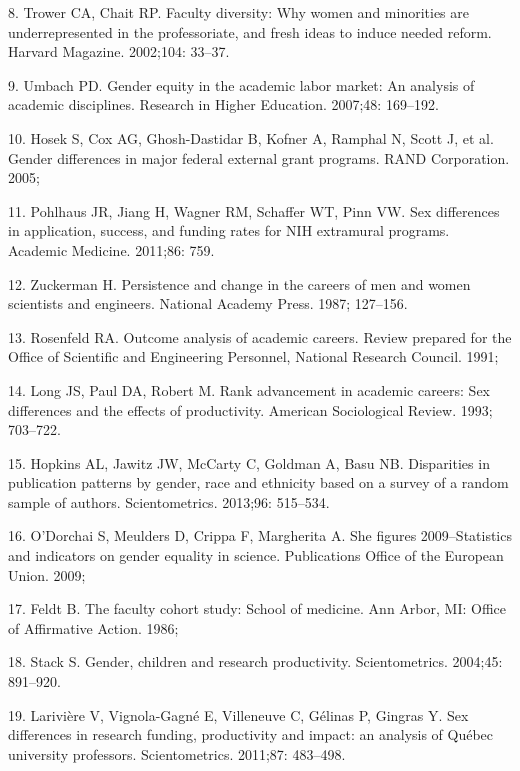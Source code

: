 \documentclass[12pt,]{article}
\begin{document}
\hypertarget{ref-Trower_2002}{}
8. Trower CA, Chait RP. Faculty diversity: Why women and minorities are
underrepresented in the professoriate, and fresh ideas to induce needed
reform. Harvard Magazine. 2002;104: 33--37.

\hypertarget{ref-Umbach_2007}{}
9. Umbach PD. Gender equity in the academic labor market: An analysis of
academic disciplines. Research in Higher Education. 2007;48: 169--192.

\hypertarget{ref-Hosek_2005}{}
10. Hosek S, Cox AG, Ghosh-Dastidar B, Kofner A, Ramphal N, Scott J, et
al. Gender differences in major federal external grant programs. RAND
Corporation. 2005;

\hypertarget{ref-pohlhaus_2011}{}
11. Pohlhaus JR, Jiang H, Wagner RM, Schaffer WT, Pinn VW. Sex
differences in application, success, and funding rates for NIH
extramural programs. Academic Medicine. 2011;86: 759.

\hypertarget{ref-Zuckerman_1987}{}
12. Zuckerman H. Persistence and change in the careers of men and women
scientists and engineers. National Academy Press. 1987; 127--156.

\hypertarget{ref-Rosenfeld_1991}{}
13. Rosenfeld RA. Outcome analysis of academic careers. Review prepared
for the Office of Scientific and Engineering Personnel, National
Research Council. 1991;

\hypertarget{ref-Long_1993}{}
14. Long JS, Paul DA, Robert M. Rank advancement in academic careers:
Sex differences and the effects of productivity. American Sociological
Review. 1993; 703--722.

\hypertarget{ref-Hopkins_2013}{}
15. Hopkins AL, Jawitz JW, McCarty C, Goldman A, Basu NB. Disparities in
publication patterns by gender, race and ethnicity based on a survey of
a random sample of authors. Scientometrics. 2013;96: 515--534.

\hypertarget{ref-ODorchai_2009}{}
16. O'Dorchai S, Meulders D, Crippa F, Margherita A. She figures
2009--Statistics and indicators on gender equality in science.
Publications Office of the European Union. 2009;

\hypertarget{ref-Feldt_1986}{}
17. Feldt B. The faculty cohort study: School of medicine. Ann Arbor,
MI: Office of Affirmative Action. 1986;

\hypertarget{ref-Stack_2004}{}
18. Stack S. Gender, children and research productivity. Scientometrics.
2004;45: 891--920.

\hypertarget{ref-Lariviere_2011}{}
19. Larivière V, Vignola-Gagné E, Villeneuve C, Gélinas P, Gingras Y.
Sex differences in research funding, productivity and impact: an
analysis of Québec university professors. Scientometrics. 2011;87:
483--498.
\end{document}
